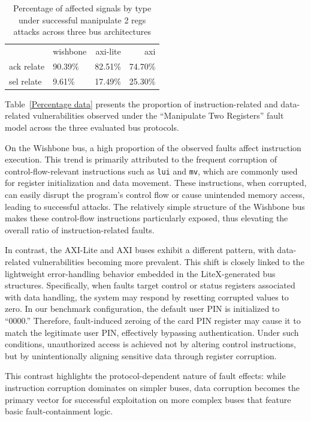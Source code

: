 \begin{table}
\caption{Percentage of affected signals by type under successful manipulate 2 regs attacks across three bus architectures}
\label{Percentage on 3 buses}
\begin{tabular}{llrr}
& wishbone & axi-lite & axi \\
ack relate & 90.39\% & 82.51\% & 74.70\% \\
sel relate & 9.61\% & 17.49\% & 25.30\% \\
\end{tabular}
\end{table}

Table~\ref{Percentage data} presents the proportion of instruction-related and data-related vulnerabilities observed under the “Manipulate Two Registers” fault model across the three evaluated bus protocols.

On the Wishbone bus, a high proportion of the observed faults affect instruction execution. This trend is primarily attributed to the frequent corruption of control-flow-relevant instructions such as \texttt{lui} and \texttt{mv}, which are commonly used for register initialization and data movement. These instructions, when corrupted, can easily disrupt the program’s control flow or cause unintended memory access, leading to successful attacks. The relatively simple structure of the Wishbone bus makes these control-flow instructions particularly exposed, thus elevating the overall ratio of instruction-related faults.

In contrast, the AXI-Lite and AXI buses exhibit a different pattern, with data-related vulnerabilities becoming more prevalent. This shift is closely linked to the lightweight error-handling behavior embedded in the LiteX-generated bus structures. Specifically, when faults target control or status registers associated with data handling, the system may respond by resetting corrupted values to zero. In our benchmark configuration, the default user PIN is initialized to “0000.” Therefore, fault-induced zeroing of the card PIN register may cause it to match the legitimate user PIN, effectively bypassing authentication. Under such conditions, unauthorized access is achieved not by altering control instructions, but by unintentionally aligning sensitive data through register corruption.

This contrast highlights the protocol-dependent nature of fault effects: while instruction corruption dominates on simpler buses, data corruption becomes the primary vector for successful exploitation on more complex buses that feature basic fault-containment logic.

